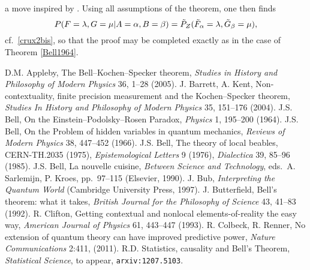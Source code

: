 \documentclass[12pt]{article}
\newcommand{\er}{\eqref}
\newcommand{\al}{\alpha} \newcommand{\bt}{L\beta}
\newcommand{\lm}{\lambda} \newcommand{\Lm}{\Lambda}
\begin{document}
a move inspired by \cite{WW}. Using all assumptions of the theorem, one then finds
\begin{equation}
P(F=\lm,G=\mu|A=\al,B=\beta)=\til{P}_Z(\til{F}_{\al}=\lm,\til{G}_{\beta}=\mu), \label{crux3bis}
\end{equation}
cf.\ \er{crux2bis}, so that the proof may be completed exactly as in the case of Theorem \ref{Bell1964}. \enp
\begin{thebibliography}{99}
\raggedright

 D.M. Appleby, The Bell--Kochen--Specker theorem, \emph{Studies in History and Philosophy of Modern Physics} 36, 1--28 (2005).
 J. Barrett, A. Kent,  Non-contextuality, finite precision measurement and the Kochen--Specker theorem, \emph{Studies In History and Philosophy of Modern Physics} 35, 151--176 (2004).
 J.S. Bell, On the Einstein--Podolsky--Rosen Paradox, \emph{Physics} 1, 195--200 (1964).
 J.S. Bell, On the Problem of hidden variables in quantum mechanics, \emph{Reviews of Modern Physics} 38, 447--452 (1966). 
 J.S. Bell, The theory of local beables, CERN-TH.2035 (1975), \emph{Epistemological Letters} 9 (1976), \emph{Dialectica} 39, 85--96 (1985). 
 J.S. Bell, La nouvelle cuisine, \emph{Between Science and Technology}, eds.\ A. Sarlemijn, P. Kroes, pp.\ 97--115 (Elsevier, 1990). 
 J. Bub, \emph{Interpreting the Quantum World} (Cambridge University Press, 1997).
  J. Butterfield, Bell's theorem: what it takes, \emph{British Journal for the  Philosophy of Science} 43, 41--83  (1992).
R. Clifton, Getting contextual and nonlocal elements-of-reality the easy way, \emph{American Journal of Physics}
 61, 443--447 (1993).
   R. Colbeck, R. Renner, No extension of quantum theory can have improved predictive power, \emph{Nature Communications} 2:411, (2011). 
  R.D. Statistics, causality and Bell's Theorem, \emph{Statistical Science}, to appear, \texttt{arxiv:1207.5103}.

\end{thebibliography}
\end{document}
